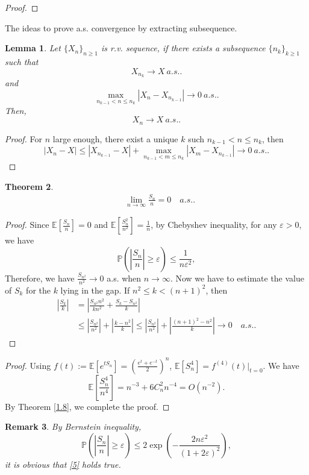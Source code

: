 \documentclass[11pt]{article}
\newtheorem{theorem}{Theorem}[section]
\newtheorem{lemma}[theorem]{Lemma}
\newtheorem{remark}[theorem]{Remark}
\theoremstyle{definition}
\newcommand{\abs}[1]{\left\vert#1\right\vert}
\begin{document}
{\begin{proof}
\end{proof}
The ideas to prove a.s. convergence by extracting subsequence.
\begin{lemma}
  Let $\{ X_n \}_{n \ge 1}$ is r.v. sequence, if there exists a subsequence $\{ n_k \}_{k\ge 1}$ such that
\[
X_{n_k}\rightarrow X\ a.s..
\]
and 
\[
\max_{n_{k-1}<n\le n_k} \abs{X_n-X_{n_{k-1}}}\rightarrow 0\ a.s..
\]
Then,
\[
X_n\rightarrow X\ a.s..
\]

\end{lemma}
\begin{proof}
  For $n$ large enough, there exist  a unique $k$ such $n_{k-1}<n\le n_k$, then
\[
\abs{X_n-X}\le \abs{X_{n_{k-1}} -X} +\max_{n_{k-1}<m\le n_k} \abs{X_m-X_{n_{k-1}}}\rightarrow 0\ a.s..
\]
\end{proof}



}

\begin{theorem}
\begin{equation}\label{5}
  \begin{aligned}
     & \lim_{n\rightarrow \infty} \frac{S_n}{n}=0 \quad a.s..
  \end{aligned}
\end{equation}
\end{theorem}
\begin{proof}
  Since $\mathbb{E}[\frac{S_n}{n}]=0$ and $\mathbb{E}[\frac{S_n^2}{n^2}]=\frac{1}{n}$, by Chebyshev inequality, for any $\varepsilon>0$, we have
\[
\mathbb{P}\left( \abs{\frac{S_n}{n}}\ge \varepsilon \right)\le \frac{1}{n\varepsilon^2},
\]
Therefore, we have $\frac{S_{n^2}}{n^2}\rightarrow 0$ a.s. when $n\rightarrow \infty$.  Now we have to  estimate the value of $S_k$ for the $k$ lying in the gap. If $n^2\le k <(n+1)^2$, then 
\begin{equation*}
  \begin{aligned}
     \abs{\frac{S_k}{k}} &=\abs{\frac{S_{n^2} n^2 }{kn^2}   +\frac{S_k-S_{n^2}}{k}}\\ 
&\le \abs{\frac{S_{n^2}}{n^2}} + \abs{\frac{k-n^2}{k}}\le \abs{\frac{S_{n^2}}{n^2}} + \abs{\frac{(n+1)^2-n^2}{k}} \rightarrow 0 \quad a.s..
  \end{aligned}
\end{equation*}
\end{proof}


\begin{proof}
Using $f(t):=\mathbb{E}[e^{tS_n}]=\left(\frac{e^t+e^{-t}}{2}\right)^n$, $\mathbb{E}[S_n^4]=f^{(4)}(t)|_{t=0}$. We have
$$\mathbb{E}\left[\frac{S_n^4}{n^4}\right]=n^{-3}+6 C^2_n n^{-4}=O(n^{-2}).$$
By Theorem \ref{1.8}, we complete the proof.
\end{proof}
\begin{remark}
  By Bernstein inequality, 
\[
\mathbb{P}\left( \abs{\frac{S_n}{n}}\ge \varepsilon \right)\le 2 \exp\left( -\frac{2n\varepsilon^2}{(1+2\varepsilon)^2} \right),
\]
it is obvious that  \eqref{5} holds true.
\end{remark}
\end{document}
